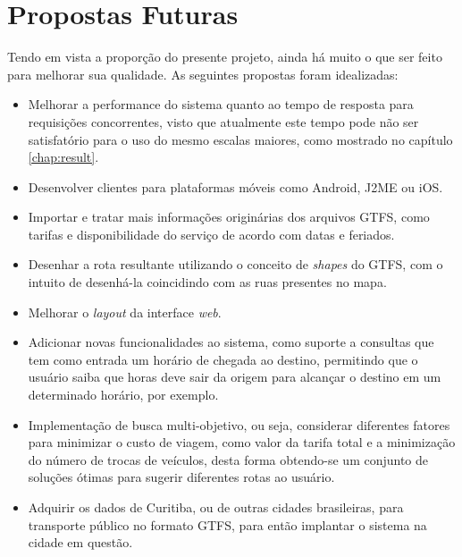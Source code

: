 \section{Propostas Futuras}

Tendo em vista a proporção do presente projeto, ainda há muito o que ser feito para melhorar sua qualidade.
As seguintes propostas foram idealizadas:

\begin{itemize}
	\item Melhorar a performance do sistema quanto ao tempo de resposta para requisições concorrentes, visto que atualmente este tempo pode não ser satisfatório para o uso do mesmo escalas maiores, como mostrado no capítulo \ref{chap:result}.
	\item Desenvolver clientes para plataformas móveis como Android, J2ME ou iOS.
	\item Importar e tratar mais informações originárias dos arquivos GTFS, como tarifas e disponibilidade do serviço de acordo com datas e feriados.
	\item Desenhar a rota resultante utilizando o conceito de \emph{shapes} do GTFS, com o intuito de desenhá-la coincidindo com as ruas presentes no mapa.
	\item Melhorar o \emph{layout} da interface \emph{web}.
	\item Adicionar novas funcionalidades ao sistema, como suporte a consultas que tem como entrada um horário de chegada ao destino, permitindo que o usuário saiba que horas deve sair da origem para alcançar o destino em um determinado horário, por exemplo.
	\item Implementação de busca multi-objetivo, ou seja, considerar diferentes fatores para minimizar o custo de viagem, como valor da tarifa total e a minimização 		do número de trocas de veículos, desta forma obtendo-se um conjunto de soluções ótimas para sugerir diferentes rotas ao usuário.
	\item Adquirir os dados de Curitiba, ou de outras cidades brasileiras, para transporte público no formato GTFS, para então implantar o sistema na cidade em questão.
\end{itemize}
